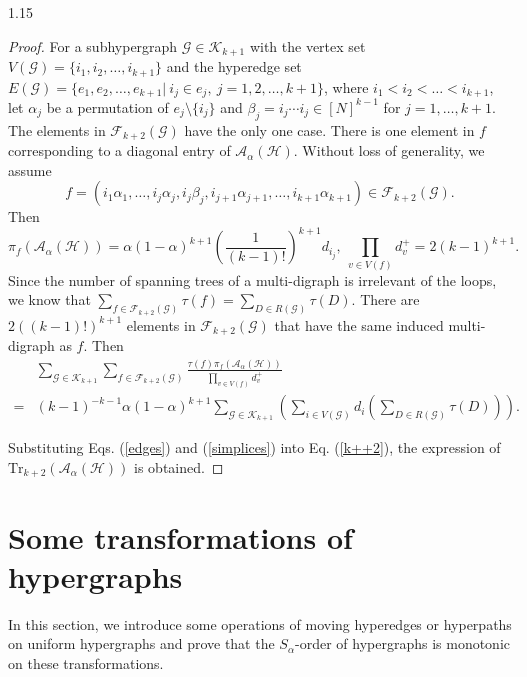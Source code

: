 \documentclass[preprint,12pt]{elsarticle1}
\numberwithin{equation}{section}
\begin{document}
\begin{spacing}{1.15}
\begin{proof}
For a subhypergraph $\mathcal{G}\in\mathcal{K}_{k+1}$ with the vertex set $V(\mathcal{G})=\{i_1,i_2,\ldots,i_{k+1}\}$ and the hyperedge set $E(\mathcal{G})=\{e_1,e_2,\ldots,e_{k+1}|~ i_j\in e_j,~ j=1,2,\ldots,k+1\}$, where $i_1<i_2<\ldots<i_{k+1}$, let $\alpha_{j}$ be a permutation of $e_j\setminus\{i_j\}$ and $\beta_{j}=i_{j}\cdots i_{j}\in[N]^{k-1}$ for $j=1,\dots,k+1$. The elements in $\mathcal{F}_{k+2}(\mathcal{G})$ have the only one case.
There is one element in $f$ corresponding to a diagonal entry of $\mathcal{A}_{\alpha}(\mathcal{H})$.
Without loss of generality, we assume $$f=(i_1\alpha_1,\ldots,i_j\alpha_j,i_j\beta_j,i_{j+1}\alpha_{j+1},\ldots,i_{k+1}\alpha_{k+1})\in\mathcal{F}_{k+2}(\mathcal{G}).$$
Then $$\pi_{f}(\mathcal{A}_{\alpha}(\mathcal{H}))=\alpha(1-\alpha)^{k+1}\left( \frac{1}{(k-1)!} \right)^{k+1}d_{i_j},~ \prod_{v\in V(f)}d_v^{+}=2(k-1)^{k+1}.$$
Since the number of spanning trees of a multi-digraph is irrelevant of the loops, we know that $\sum_{f\in\mathcal{F}_{k+2}(\mathcal{G})}\tau(f)=\sum_{D\in R(\mathcal{G})}\tau(D)$. There are $2((k-1)!)^{k+1}$ elements in $\mathcal{F}_{k+2}(\mathcal{G})$ that have the same induced multi-digraph as $f$. Then
\begin{equation}\label{simplices}
\begin{aligned}
&\sum\limits_{\mathcal{G}\in\mathcal{K}_{k+1}}\sum\limits_{f\in\mathcal{F}_{k+2}(\mathcal{G})}\frac{\tau(f) \pi_{f}(\mathcal{A}_{\alpha}(\mathcal{H}))}{\prod\limits_{v\in V(f)}d_v^{+}}\\
=&(k-1)^{-k-1}\alpha(1-\alpha)^{k+1}\sum\limits_{\mathcal{G}\in \mathcal{K}_{k+1}}\left( \sum\limits_{i\in V(\mathcal{G})}d_i \left( \sum\limits_{D\in R(\mathcal{G})}\tau(D) \right) \right).
\end{aligned}
\end{equation}

Substituting Eqs. (\ref{edges}) and (\ref{simplices}) into Eq. (\ref{k++2}), the expression of $\mathrm{Tr}_{k+2}(\mathcal{A}_{\alpha}(\mathcal{H}))$ is obtained.
\end{proof}



\section{Some transformations of hypergraphs}
In this section, we introduce some operations of moving hyperedges or hyperpaths on uniform hypergraphs and prove that the $S_{\alpha}$-order of hypergraphs is monotonic on these transformations.


\end{spacing}
\end{document}

